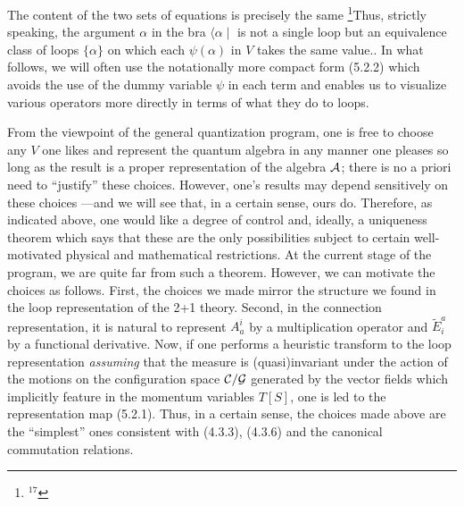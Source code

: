 The content of the two sets of equations is precisely the same%
\footnote{$^{17}$}{Thus, strictly speaking, the argument $\alpha$ in the bra
$\langle \alpha\mid$ is not a single loop but an equivalence class of loops
$\{\alpha\}$ on which each $\psi(\alpha )$ in $V$ takes the same value.}.
In what follows, we will often use the notationally more compact form (5.2.2)
which avoids the use of the dummy variable $\psi$ in each term and enables
us to visualize various operators more directly in terms of what they do to
loops.

{}From the viewpoint of the general quantization program, one is free to
choose any $V$ one likes and represent the quantum algebra in any manner
one pleases so long as the result is a proper representation of the algebra
${\cal A}$; there is no a priori need to ``justify'' these choices. However,
one's results may depend sensitively on these choices ---and we will see
that, in a certain sense, ours do. Therefore, as indicated above, one would
like a degree of control and, ideally, a uniqueness theorem which says that
these are the only possibilities subject to certain well-motivated physical
and mathematical restrictions. At the current stage of the program, we are
quite far from such a theorem. However, we can motivate the choices
as follows. First, the choices we made mirror the structure we found in
the loop representation of the 2+1 theory. Second, in the connection
representation, it is natural to represent $A_a^i$ by a multiplication
operator and $\tilde{E}^a_i$ by a functional derivative. Now, if one performs
a heuristic transform to the loop representation {\it assuming} that the
measure is (quasi)\-invariant under the action of the motions on the
configuration space ${\cal C}/{\cal G}$ generated by the vector fields which
implicitly feature in the momentum variables $T[S]$, one is led to the
representation map (5.2.1). Thus, in a certain sense, the choices made above
are the ``simplest'' ones consistent with (4.3.3), (4.3.6) and the canonical
commutation relations.

